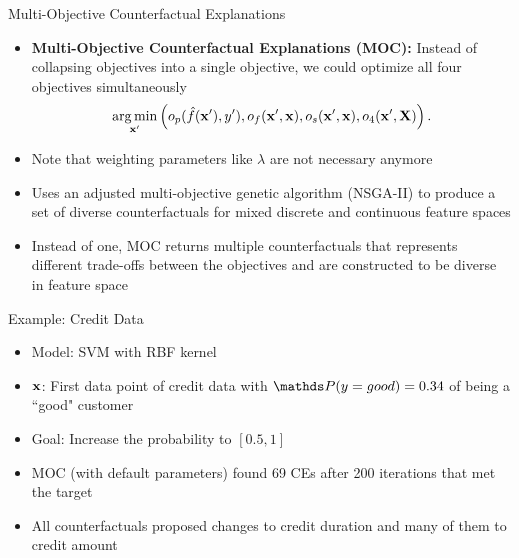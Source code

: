 \documentclass[10pt,compress,t,notes=noshow, xcolor=table]{beamer}
\begin{document}
\begin{frame}{Multi-Objective Counterfactual Explanations }
	\begin{itemize}
		\item \textbf{Multi-Objective Counterfactual Explanations (MOC):} Instead of collapsing objectives into a single objective, we could optimize all four objectives simultaneously
	$$	\mathop{\mathrm{arg\,min}}_{\mathbf{x}'} \left(o_p(\hat{f}(\mathbf{x}'), y'), o_f(\mathbf{x}', \mathbf{x}), o_s(\mathbf{x}', \mathbf{x}), o_4(\mathbf{x}', \mathbf{X}) \right). $$
		
		\item Note that weighting parameters like $\lambda$ are not necessary anymore
		\item Uses an adjusted multi-objective genetic algorithm (NSGA-II) to produce a set of diverse counterfactuals for mixed discrete and continuous feature spaces
		\item Instead of one, MOC returns multiple counterfactuals that represents different trade-offs between the objectives and are constructed to be diverse in feature space
	\end{itemize}

\end{frame}

\begin{frame}{Example: Credit Data}
	\begin{itemize}
		\item Model: SVM with RBF kernel
		\item $\mathbf{x}$: First data point of credit data with $\P(y = good)  = 0.34$ of being a ``good" customer
		\item Goal: Increase the probability to $[0.5, 1]$
		\item MOC (with default parameters) found 69 CEs after 200 iterations that met the target
		\item All counterfactuals proposed changes to credit duration and many of them to credit amount
	\end{itemize}
\end{frame}
\end{document}
